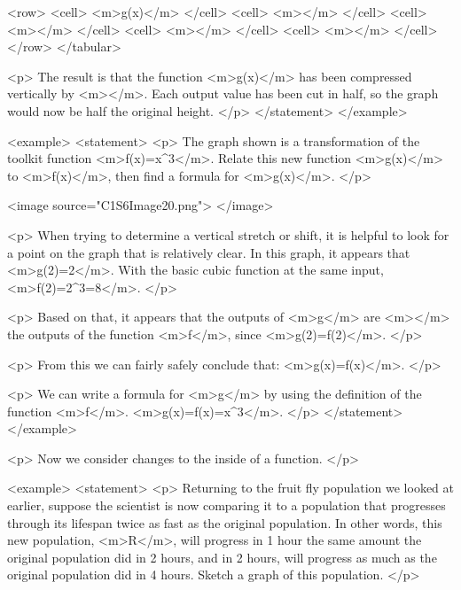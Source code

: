                     <row>
                        <cell> <m>g(x)</m> </cell>
                        <cell> <m></m> </cell>
                        <cell> <m></m> </cell>
                        <cell> <m></m> </cell>
                        <cell> <m></m> </cell>
                    </row>
                </tabular>

                <p>
                    The result is that the function <m>g(x)</m> has been compressed vertically by <m></m>.
                    Each output value has been cut in half, so the graph would now be half the original height.
                </p>
            </statement>
        </example>

        <example>
            <statement>
                <p>
                    The graph shown is a transformation of the toolkit function <m>f(x)=x^{3}</m>.
                    Relate this new function <m>g(x)</m> to <m>f(x)</m>, then find a formula for <m>g(x)</m>.
                </p>

                <image source="C1S6Image20.png">
                </image>

                <p>
                    When trying to determine a vertical stretch or shift, it is helpful to look for a point on the graph that is relatively clear.
                    In this graph, it appears that <m>g(2)=2</m>.
                    With the basic cubic function at the same input, <m>f(2)=2^{3}=8</m>.
                </p>

                <p>
                    Based on that, it appears that the outputs of <m>g</m> are <m></m> the outputs of the function <m>f</m>, since <m>g(2)=f(2)</m>.
                </p>

                <p>
                    From this we can fairly safely conclude that: <m>g(x)=f(x)</m>.
                </p>

                <p>
                    We can write a formula for <m>g</m> by using the definition of the function <m>f</m>.
                    <m>g(x)=f(x)=x^{3}</m>.
                </p>
            </statement>
        </example>

        <p>
            Now we consider changes to the inside of a function.
        </p>

        <example>
            <statement>
                <p>
                    Returning to the fruit fly population we looked at earlier, suppose the scientist is now comparing it to a population that progresses through its lifespan twice as fast as the original population.
                    In other words, this new population, <m>R</m>, will progress in 1 hour the same amount the original population did in 2 hours, and in 2 hours, will progress as much as the original population did in 4 hours.
                    Sketch a graph of this population.
                </p>

